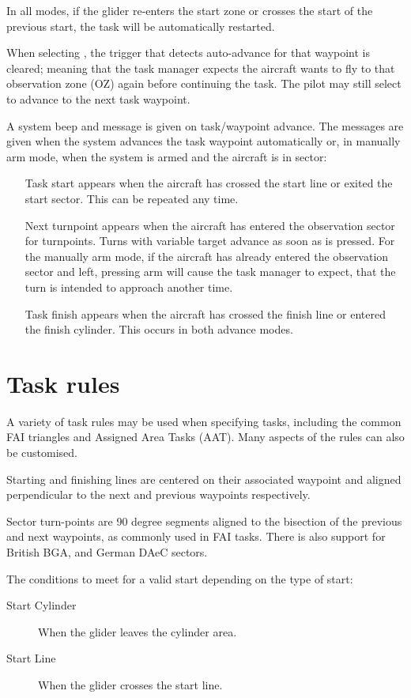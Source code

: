 In all modes, if the glider re-enters the start zone or crosses the
start of the previous start, the task will be automatically restarted. 

When selecting , the trigger that detects
auto-advance for that waypoint is cleared; meaning that the task
manager expects the aircraft wants to fly to that observation zone (OZ)
again before continuing the task.  The pilot may still select  to advance to the next task waypoint.

A system beep and message is given on task/waypoint advance.  The
messages are given when the system advances the task waypoint
automatically or, in manually arm mode, when the system is armed and the
aircraft is in sector:
\begin{itemize}
\item[Task start]  appears when the aircraft has crossed the start line or
 exited the start sector. This can be repeated any time.
\item[Next turnpoint]  appears when the aircraft has entered the observation
 sector for turnpoints. Turns with variable target advance as soon as
  is pressed.  For the manually arm mode, if the
 aircraft has already entered the observation sector and left, pressing arm will
 cause the task manager to expect, that the turn is intended to approach
 another time.
\item[Task finish]  appears when the aircraft has crossed the finish line
 or entered the finish cylinder.  This occurs in both advance modes. 
\end{itemize}

\section{Task rules}\label{sec:task-rules}

A variety of task rules may be used when specifying tasks, including
the common FAI triangles and Assigned Area Tasks (AAT).  Many aspects
of the rules can also be customised.

Starting and finishing lines are centered on their associated waypoint
and aligned perpendicular to the next and previous waypoints
respectively.

Sector turn-points are 90 degree segments aligned to the bisection of
the previous and next waypoints, as commonly used in FAI tasks.
There is also support for British BGA, and German DAeC sectors.

The conditions to meet for a valid start depending on the type of start:
\begin{description}
\item[Start Cylinder] When the glider leaves the cylinder area.
\item[Start Line] When the glider crosses the start line.
\end{description}

